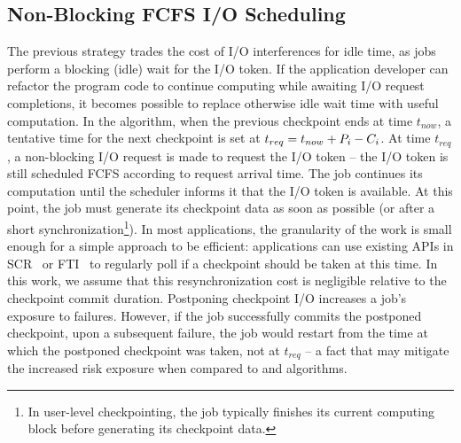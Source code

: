 
\subsection{Non-Blocking \fifononblock FCFS I/O Scheduling}
\label{sec:fcfsnonblock}

The previous strategy trades the cost of I/O interferences for
idle time, as jobs perform a blocking (idle) wait for the I/O token.
If the application developer can refactor the program code to continue
computing while awaiting I/O request completions, it becomes possible
to replace otherwise idle wait time with useful computation. In the
\fifononblock algorithm, when the previous checkpoint ends at time
$t_{now}$, a tentative time for the next checkpoint is set at
$t_{req}=t_{now}+P_{i}-C_{i}$.  At time $t_{req}$, a
non-blocking I/O request is made to request the I/O token -- the I/O
token is still scheduled FCFS according to request arrival time.  The
job continues its computation until the scheduler informs it that the
I/O token is available. At this point, the job must generate its
checkpoint data as soon as possible (or after a short
synchronization\footnote{In user-level checkpointing, the job typically
  finishes its current computing block before generating its
  checkpoint data.}).  In most applications, the granularity of the
work is small enough for a simple approach to be efficient:
applications can use existing APIs in SCR~\cite{Moody10SCR} or
FTI~\cite{Bautista-Gomez11_FTI} to regularly poll if a checkpoint
should be taken at this time. In this work, we assume that this
resynchronization cost is negligible relative to the checkpoint commit
duration.
%
%
Postponing checkpoint I/O increases a job's exposure to failures.  However,
if the job successfully commits the postponed checkpoint, upon a subsequent failure,
the job would restart from the time at which the postponed checkpoint was taken, not
at $t_{req}$ -- a fact that may mitigate the increased risk exposure when
compared to \fifoblock and \nocoop algorithms.



